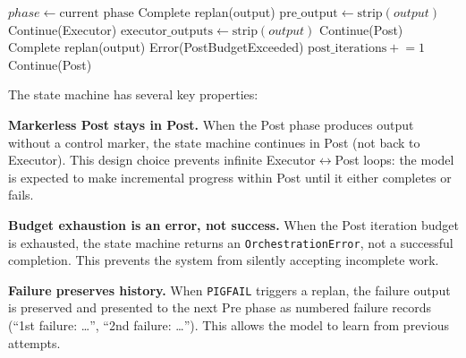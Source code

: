 \begin{algorithm}[t]
\caption{Phase state machine transition}
\label{alg:state}
\begin{algorithmic}[1]
  \State $phase \gets \text{current phase}$
      \State \Return Complete 
      \State \Return replan(output) 
    \Else
      \State $\text{pre\_output} \gets \text{strip}(output)$
      \State \Return Continue(Executor)
    \EndIf
    \State $\text{executor\_outputs} \gets \text{strip}(output)$
    \State \Return Continue(Post) 
  \Else {}
      \State \Return Complete
      \State \Return replan(output)
    \Else
        \State \Return Error(PostBudgetExceeded)
      \EndIf
      \State $\text{post\_iterations} \mathrel{+}= 1$
      \State \Return Continue(Post) 
    \EndIf
  \EndIf
\EndFunction
\end{algorithmic}
\end{algorithm}

The state machine has several key properties:

\textbf{Markerless Post stays in Post.} When the Post phase produces output without a control marker, the state machine continues in Post (not back to Executor). This design choice prevents infinite Executor$\leftrightarrow$Post loops: the model is expected to make incremental progress within Post until it either completes or fails.

\textbf{Budget exhaustion is an error, not success.} When the Post iteration budget is exhausted, the state machine returns an \texttt{OrchestrationError}, not a successful completion. This prevents the system from silently accepting incomplete work.

\textbf{Failure preserves history.} When \texttt{PIGFAIL} triggers a replan, the failure output is preserved and presented to the next Pre phase as numbered failure records (``1st failure: \ldots'', ``2nd failure: \ldots''). This allows the model to learn from previous attempts.

